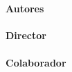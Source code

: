 {\vfill

\begin{large}
\begin{center}
\textoPrimerSubtituloPortadaVal
\mbox{ } \\ \mbox{ } \\ 
{\Large \bfseries Autores}\\
\textbf{\autorPortadaVal}\\[1.0cm]
{\Large \bfseries Director}\\
\textbf{\directorPortadaVal}\\[0.3cm]
\ifx\colaboradorPortadaVal\empty
\else
{\Large \bfseries Colaborador}\\
\textbf{\colaboradorPortadaVal}\\[0.3cm]
\fi
\mbox{ } \\ \mbox{ } \\ 
\textoSegundoSubtituloPortadaVal \\ [0.3em]
\end{center}
\end{large}

\vfill

\begin{large}
\begin{center}
\textbf{\institucionVal}\\[0.2em]
    \mbox{ }  \\
\textbf{\fechaPublicacionVal}
\end{center}
\end{large}


\newpage
\thispagestyle{empty}
%

} %

